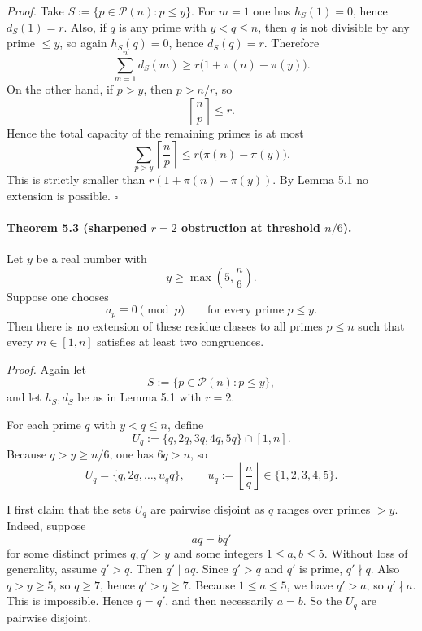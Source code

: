 \emph{Proof.}
Take \(S:=\{p\in\mathcal P(n): p\le y\}\).
For \(m=1\) one has \(h_S(1)=0\), hence \(d_S(1)=r\).
Also, if \(q\) is any prime with \(y<q\le n\), then \(q\) is not divisible by any prime \(\le y\), so again \(h_S(q)=0\), hence \(d_S(q)=r\).
Therefore
\[
\sum_{m=1}^n d_S(m)
\ge
r\bigl(1+\pi(n)-\pi(y)\bigr).
\]
On the other hand, if \(p>y\), then \(p>n/r\), so
\[
\left\lceil \frac{n}{p}\right\rceil \le r.
\]
Hence the total capacity of the remaining primes is at most
\[
\sum_{p>y}\left\lceil \frac{n}{p}\right\rceil
\le
r\bigl(\pi(n)-\pi(y)\bigr).
\]
This is strictly smaller than \(r(1+\pi(n)-\pi(y))\).
By Lemma 5.1 no extension is possible.
\hfill$\square$

\paragraph{Theorem 5.3 (sharpened \(r=2\) obstruction at threshold \(n/6\)).}
Let \(y\) be a real number with
\[
y\ge \max\left(5,\frac{n}{6}\right).
\]
Suppose one chooses
\[
a_p\equiv 0\pmod p \qquad\text{for every prime }p\le y.
\]
Then there is no extension of these residue classes to all primes \(p\le n\) such that every \(m\in[1,n]\) satisfies at least two congruences.

\emph{Proof.}
Again let
\[
S:=\{p\in\mathcal P(n): p\le y\},
\]
and let \(h_S,d_S\) be as in Lemma 5.1 with \(r=2\).

For each prime \(q\) with \(y<q\le n\), define
\[
U_q:=\{q,2q,3q,4q,5q\}\cap [1,n].
\]
Because \(q>y\ge n/6\), one has \(6q>n\), so
\[
U_q=\{q,2q,\dots,u_q q\},
\qquad u_q:=\left\lfloor\frac{n}{q}\right\rfloor\in\{1,2,3,4,5\}.
\]

I first claim that the sets \(U_q\) are pairwise disjoint as \(q\) ranges over primes \(>y\).
Indeed, suppose
\[
aq=bq'
\]
for some distinct primes \(q,q'>y\) and some integers \(1\le a,b\le 5\).
Without loss of generality, assume \(q'>q\).
Then \(q'\mid aq\).
Since \(q'>q\) and \(q'\) is prime, \(q'\nmid q\).
Also \(q>y\ge 5\), so \(q\ge 7\), hence \(q'>q\ge 7\).
Because \(1\le a\le 5\), we have \(q'>a\), so \(q'\nmid a\).
This is impossible.
Hence \(q=q'\), and then necessarily \(a=b\).
So the \(U_q\) are pairwise disjoint.

